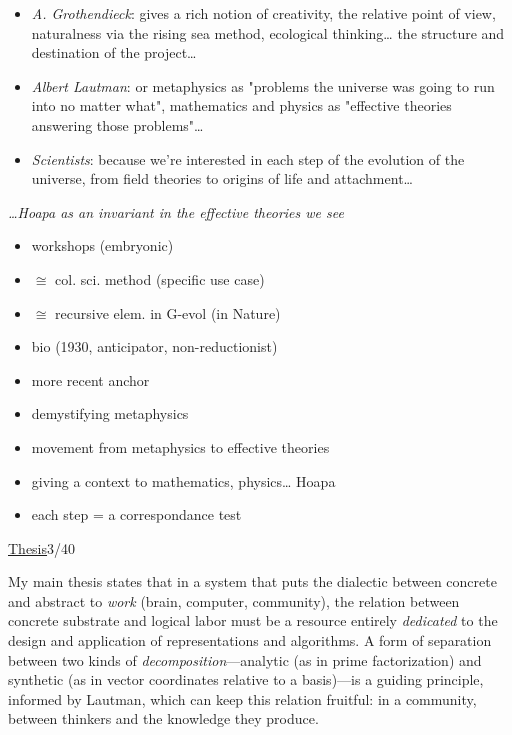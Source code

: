 \documentclass[a4paper,10pt]{article}
\newcommand{\slidehead}[2]{\par\addvspace{7pt}\noindent\underline{#1}\hfill{\color{gray}#2}\par\nopagebreak\vspace{1pt}}
\newcommand{\transition}[1]{\par{\color{black!70}\emph{#1}}\par}
\newcommand{\marked}[1]{\par\addvspace{2pt}{\bfseries #1}\par\nopagebreak}
\renewenvironment{leftbar}{%
  \def\FrameCommand{{\color{black!30}\vrule width 1.2pt}\hspace{6pt}}%
  \MakeFramed{\advance\hsize-\width \FrameRestore}}{\endMakeFramed}
\newenvironment{commentary}{\par\vspace{-2pt}\begin{leftbar}\color{black!80}}{\end{leftbar}}
\begin{document}
\begin{itemize}
\item \textcolor{risingseateal}{\emph{A. Grothendieck}}: gives a rich notion of creativity, the relative point of view, naturalness via the rising sea method, ecological thinking… the structure and destination of the project…
\item \textcolor{metaphysicsamber}{\emph{Albert Lautman}}: or metaphysics as "problems the universe was going to run into no matter what", mathematics and physics as "effective theories answering those problems"…
\item \textcolor{scienceblue}{\emph{Scientists}}: because we're interested in each step of the evolution of the universe, from field theories to origins of life and attachment…
\end{itemize}
\transition{…Hoapa as an invariant in the effective theories we see}
\begin{commentary}
\marked{\textcolor{risingseateal}{A. Grothendieck}}
\begin{itemize}
\item workshops (embryonic)
\item \ensuremath{\cong} col. sci. method (specific use case)
\item \ensuremath{\cong} recursive elem. in G-evol (in Nature)
\end{itemize}
\marked{\textcolor{metaphysicsamber}{Albert Lautman}}
\begin{itemize}
\item bio (1930, anticipator, non-reductionist)
\item more recent anchor
\end{itemize}\vspace{2pt}
\begin{itemize}
\item demystifying metaphysics
\item movement from metaphysics to effective theories
\item giving a context to mathematics, physics… Hoapa
\end{itemize}
\marked{\textcolor{scienceblue}{Scientists}}
\begin{itemize}
\item each step = a correspondance test
\end{itemize}
\end{commentary}
\slidehead{Thesis}{3/40}
My main thesis states that in a system that puts the dialectic between concrete and abstract to \textcolor{energyorange}{\emph{work}} (brain, computer, community), the relation between concrete substrate and logical labor must be a resource entirely \textcolor{dedicationmagenta}{\emph{dedicated}} to the design and application of representations and algorithms. A form of separation between two kinds of \textcolor{decompositionocean}{\emph{decomposition}}—analytic (as in prime factorization) and synthetic (as in vector coordinates relative to a basis)—is a guiding principle, informed by Lautman, which can keep this relation fruitful: in a community, between thinkers and the knowledge they produce.\par
\end{document}
